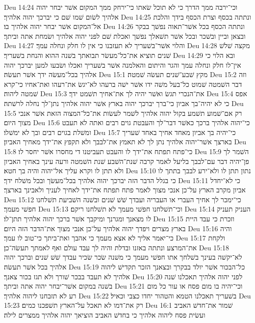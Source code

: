 Deu 14:24  וכי־ירבה ממך הדרך כי לא תוכל שׂאתו כי־ירחק ממך המקום אשׁר יבחר יהוה אלהיך לשׂום שׁמו שׁם כי יברכך יהוה אלהיך׃
Deu 14:25  ונתתה בכסף וצרת הכסף בידך והלכת אל־המקום אשׁר יבחר יהוה אלהיך בו׃
Deu 14:26  ונתתה הכסף בכל אשׁר־תאוה נפשׁך בבקר ובצאן וביין ובשׁכר ובכל אשׁר תשׁאלך נפשׁך ואכלת שׁם לפני יהוה אלהיך ושׂמחת אתה וביתך׃
Deu 14:27  והלוי אשׁר־בשׁעריך לא תעזבנו כי אין לו חלק ונחלה עמך׃
Deu 14:28  מקצה שׁלשׁ שׁנים תוציא את־כל־מעשׂר תבואתך בשׁנה ההוא והנחת בשׁעריך׃
Deu 14:29  ובא הלוי כי אין־לו חלק ונחלה עמך והגר והיתום והאלמנה אשׁר בשׁעריך ואכלו ושׂבעו למען יברכך יהוה אלהיך בכל־מעשׂה ידך אשׁר תעשׂה׃
Deu 15:1  מקץ שׁבע־שׁנים תעשׂה שׁמטה׃
Deu 15:2  וזה דבר השׁמטה שׁמוט כל־בעל משׁה ידו אשׁר ישׁה ברעהו לא־יגשׂ את־רעהו ואת־אחיו כי־קרא שׁמטה ליהוה׃
Deu 15:3  את־הנכרי תגשׂ ואשׁר יהיה לך את־אחיך תשׁמט ידך׃
Deu 15:4  אפס כי לא יהיה־בך אביון כי־ברך יברכך יהוה בארץ אשׁר יהוה אלהיך נתן־לך נחלה לרשׁתה׃
Deu 15:5  רק אם־שׁמוע תשׁמע בקול יהוה אלהיך לשׁמר לעשׂות את־כל־המצוה הזאת אשׁר אנכי מצוך היום׃
Deu 15:6  כי־יהוה אלהיך ברכך כאשׁר דבר־לך והעבטת גוים רבים ואתה לא תעבט ומשׁלת בגוים רבים ובך לא ימשׁלו׃
Deu 15:7  כי־יהיה בך אביון מאחד אחיך באחד שׁעריך בארצך אשׁר־יהוה אלהיך נתן לך לא תאמץ את־לבבך ולא תקפץ את־ידך מאחיך האביון׃
Deu 15:8  כי־פתח תפתח את־ידך לו והעבט תעביטנו די מחסרו אשׁר יחסר לו׃
Deu 15:9  השׁמר לך פן־יהיה דבר עם־לבבך בליעל לאמר קרבה שׁנת־השׁבע שׁנת השׁמטה ורעה עינך באחיך האביון ולא תתן לו וקרא עליך אל־יהוה והיה בך חטא׃
Deu 15:10  נתון תתן לו ולא־ירע לבבך בתתך לו כי בגלל הדבר הזה יברכך יהוה אלהיך בכל־מעשׂך ובכל משׁלח ידך׃
Deu 15:11  כי לא־יחדל אביון מקרב הארץ על־כן אנכי מצוך לאמר פתח תפתח את־ידך לאחיך לעניך ולאבינך בארצך׃
Deu 15:12  כי־ימכר לך אחיך העברי או העבריה ועבדך שׁשׁ שׁנים ובשׁנה השׁביעת תשׁלחנו חפשׁי מעמך׃
Deu 15:13  וכי־תשׁלחנו חפשׁי מעמך לא תשׁלחנו ריקם׃
Deu 15:14  העניק תעניק לו מצאנך ומגרנך ומיקבך אשׁר ברכך יהוה אלהיך תתן־לו׃
Deu 15:15  וזכרת כי עבד היית בארץ מצרים ויפדך יהוה אלהיך על־כן אנכי מצוך את־הדבר הזה היום׃
Deu 15:16  והיה כי־יאמר אליך לא אצא מעמך כי אהבך ואת־ביתך כי־טוב לו עמך׃
Deu 15:17  ולקחת את־המרצע ונתתה באזנו ובדלת והיה לך עבד עולם ואף לאמתך תעשׂה־כן׃
Deu 15:18  לא־יקשׁה בעינך בשׁלחך אתו חפשׁי מעמך כי משׁנה שׂכר שׂכיר עבדך שׁשׁ שׁנים וברכך יהוה אלהיך בכל אשׁר תעשׂה׃
Deu 15:19  כל־הבכור אשׁר יולד בבקרך ובצאנך הזכר תקדישׁ ליהוה אלהיך לא תעבד בבכר שׁורך ולא תגז בכור צאנך׃
Deu 15:20  לפני יהוה אלהיך תאכלנו שׁנה בשׁנה במקום אשׁר־יבחר יהוה אתה וביתך׃
Deu 15:21  וכי־יהיה בו מום פסח או עור כל מום רע לא תזבחנו ליהוה אלהיך׃
Deu 15:22  בשׁעריך תאכלנו הטמא והטהור יחדו כצבי וכאיל׃
Deu 15:23  רק את־דמו לא תאכל על־הארץ תשׁפכנו כמים׃
Deu 16:1  שׁמור את־חדשׁ האביב ועשׂית פסח ליהוה אלהיך כי בחדשׁ האביב הוציאך יהוה אלהיך ממצרים לילה׃
